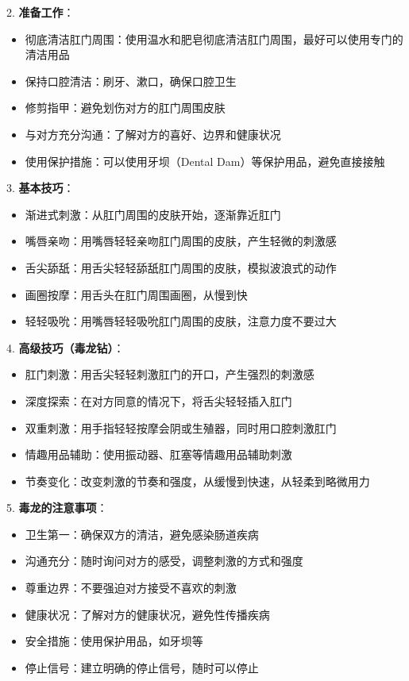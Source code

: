 \documentclass[12pt,UTF8]{ctexbook}
\begin{document}
2. \textbf{准备工作}：
  \begin{itemize}
  \item 彻底清洁肛门周围：使用温水和肥皂彻底清洁肛门周围，最好可以使用专门的清洁用品
  \item 保持口腔清洁：刷牙、漱口，确保口腔卫生
  \item 修剪指甲：避免划伤对方的肛门周围皮肤
  \item 与对方充分沟通：了解对方的喜好、边界和健康状况
  \item 使用保护措施：可以使用牙坝（Dental Dam）等保护用品，避免直接接触
  \end{itemize}

3. \textbf{基本技巧}：
  \begin{itemize}
  \item 渐进式刺激：从肛门周围的皮肤开始，逐渐靠近肛门
  \item 嘴唇亲吻：用嘴唇轻轻亲吻肛门周围的皮肤，产生轻微的刺激感
  \item 舌尖舔舐：用舌尖轻轻舔舐肛门周围的皮肤，模拟波浪式的动作
  \item 画圈按摩：用舌头在肛门周围画圈，从慢到快
  \item 轻轻吸吮：用嘴唇轻轻吸吮肛门周围的皮肤，注意力度不要过大
  \end{itemize}

4. \textbf{高级技巧（毒龙钻）}：
  \begin{itemize}
  \item 肛门刺激：用舌尖轻轻刺激肛门的开口，产生强烈的刺激感
  \item 深度探索：在对方同意的情况下，将舌尖轻轻插入肛门
  \item 双重刺激：用手指轻轻按摩会阴或生殖器，同时用口腔刺激肛门
  \item 情趣用品辅助：使用振动器、肛塞等情趣用品辅助刺激
  \item 节奏变化：改变刺激的节奏和强度，从缓慢到快速，从轻柔到略微用力
  \end{itemize}

5. \textbf{毒龙的注意事项}：
  \begin{itemize}
  \item 卫生第一：确保双方的清洁，避免感染肠道疾病
  \item 沟通充分：随时询问对方的感受，调整刺激的方式和强度
  \item 尊重边界：不要强迫对方接受不喜欢的刺激
  \item 健康状况：了解对方的健康状况，避免性传播疾病
  \item 安全措施：使用保护用品，如牙坝等
  \item 停止信号：建立明确的停止信号，随时可以停止
  \end{itemize}
\end{document}
